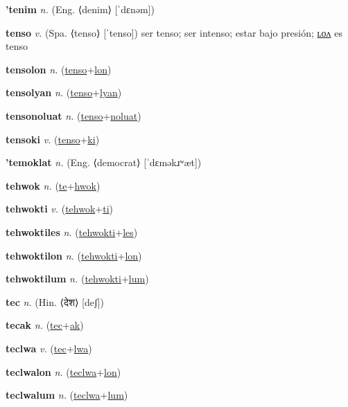 \textbf{\hypertarget{'tenim}{'tenim}} \textit{n.} (Eng. ⟨denim⟩ [ˈdɛnəm])


\textbf{\hypertarget{tenso}{tenso}} \textit{v.} (Spa. ⟨tenso⟩ [ˈtenso])
ser tenso; ser intenso; estar bajo presión; \hyperlink{tensolon}{ʟᴏᴧ} es tenso

\textbf{\hypertarget{tensolon}{tensolon}} \textit{n.} (\hyperlink{tenso}{tenso}+\allowbreak \hyperlink{lon}{lon})


\textbf{\hypertarget{tensolyan}{tensolyan}} \textit{n.} (\hyperlink{tenso}{tenso}+\allowbreak \hyperlink{lyan}{lyan})


\textbf{\hypertarget{tensonoluat}{tensonoluat}} \textit{n.} (\hyperlink{tenso}{tenso}+\allowbreak \hyperlink{noluat}{noluat})


\textbf{\hypertarget{tensoki}{tensoki}} \textit{v.} (\hyperlink{tenso}{tenso}+\allowbreak \hyperlink{ki}{ki})


\textbf{\hypertarget{'temoklat}{'temoklat}} \textit{n.} (Eng. ⟨democrat⟩ [ˈdɛməkɹʷæt])


\textbf{\hypertarget{tehwok}{tehwok}} \textit{n.} (\hyperlink{te}{te}+\allowbreak \hyperlink{hwok}{hwok})


\textbf{\hypertarget{tehwokti}{tehwokti}} \textit{v.} (\hyperlink{tehwok}{tehwok}+\allowbreak \hyperlink{ti}{ti})


\textbf{\hypertarget{tehwoktiles}{tehwoktiles}} \textit{n.} (\hyperlink{tehwokti}{tehwokti}+\allowbreak \hyperlink{les}{les})


\textbf{\hypertarget{tehwoktilon}{tehwoktilon}} \textit{n.} (\hyperlink{tehwokti}{tehwokti}+\allowbreak \hyperlink{lon}{lon})


\textbf{\hypertarget{tehwoktilum}{tehwoktilum}} \textit{n.} (\hyperlink{tehwokti}{tehwokti}+\allowbreak \hyperlink{lum}{lum})


\textbf{\hypertarget{tec}{tec}} \textit{n.} (Hin. ⟨{\devanagari{}देश}⟩ [deʃ])


\textbf{\hypertarget{tecak}{tecak}} \textit{n.} (\hyperlink{tec}{tec}+\allowbreak \hyperlink{ak}{ak})


\textbf{\hypertarget{teclwa}{teclwa}} \textit{v.} (\hyperlink{tec}{tec}+\allowbreak \hyperlink{lwa}{lwa})


\textbf{\hypertarget{teclwalon}{teclwalon}} \textit{n.} (\hyperlink{teclwa}{teclwa}+\allowbreak \hyperlink{lon}{lon})


\textbf{\hypertarget{teclwalum}{teclwalum}} \textit{n.} (\hyperlink{teclwa}{teclwa}+\allowbreak \hyperlink{lum}{lum})


